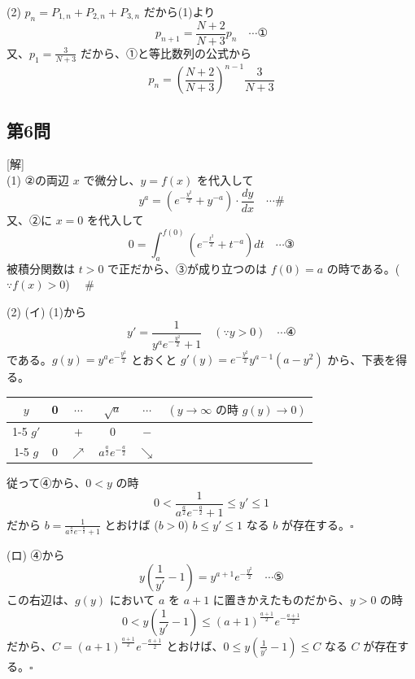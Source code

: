 \documentclass[../main.tex]{subfiles}
\begin{document}
(2) $p_n = P_{1,n} + P_{2,n} + P_{3,n}$ だから(1)より
\[ p_{n+1} = \frac{N+2}{N+3} p_n \quad \cdots \text{①} \]
又、$p_1 = \frac{3}{N+3}$ だから、①と等比数列の公式から
\[ p_n = \left(\frac{N+2}{N+3}\right)^{n-1} \frac{3}{N+3} \]

\subsection*{第6問}
[解] \\
(1) ②の両辺 $x$ で微分し、$y=f(x)$ を代入して
\[ y^a = \left( e^{-\frac{y^2}{2}} + y^{-a} \right) \cdot \frac{dy}{dx} \quad \cdots \# \]
又、②に $x=0$ を代入して
\[ 0 = \int_a^{f(0)} \left( e^{-\frac{t^2}{2}} + t^{-a} \right) dt \quad \cdots \text{③} \]
被積分関数は $t>0$ で正だから、③が成り立つのは $f(0) = a$ の時である。($\because f(x)>0$) $\quad \#$

(2) (イ) (1)から
\[ y' = \frac{1}{y^a e^{-\frac{y^2}{2}} + 1} \quad (\because y>0) \quad \cdots \text{④} \]
である。$g(y) = y^a e^{-\frac{y^2}{2}}$ とおくと $g'(y) = e^{-\frac{y^2}{2}} y^{a-1} (a - y^2)$ から、下表を得る。
\begin{center}
  \begin{tabular}{|c|c|c|c|c|c|}
    \hline
    $y$ & 0 & $\cdots$ & $\sqrt{a}$ & $\cdots$ & \multirow{3}{*}{$(y \to \infty \text{ の時 } g(y) \to 0)$} \\
    \cline{1-5}
    $g'$ & & $+$ & $0$ & $-$ & \\
    \cline{1-5}
    $g$ & 0 & $\nearrow$ & $a^{\frac{a}{2}} e^{-\frac{a}{2}}$ & $\searrow$ & \\
    \hline
  \end{tabular}
\end{center}
従って④から、$0 < y$ の時
\[ 0 < \frac{1}{a^{\frac{a}{2}} e^{-\frac{a}{2}} + 1} \le y' \le 1 \]
だから $b = \frac{1}{a^{\frac{a}{2}} e^{-\frac{a}{2}} + 1}$ とおけば ($b>0$) $b \le y' \le 1$ なる $b$ が存在する。$\square$

(ロ) ④から
\[ y \left(\frac{1}{y'} - 1\right) = y^{a+1} e^{-\frac{y^2}{2}} \quad \cdots \text{⑤} \]
この右辺は、$g(y)$ において $a$ を $a+1$ に置きかえたものだから、$y>0$ の時
\[ 0 < y \left(\frac{1}{y'} - 1\right) \le (a+1)^{\frac{a+1}{2}} e^{-\frac{a+1}{2}} \]
だから、$C = (a+1)^{\frac{a+1}{2}} e^{-\frac{a+1}{2}}$ とおけば、$0 \le y \left(\frac{1}{y'} - 1\right) \le C$ なる $C$ が存在する。$\square$
\end{document}
